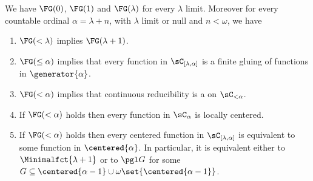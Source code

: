 \begin{proposition}\label{FGconsequences} We have $\FG(0)$, $\FG(1)$ and $\FG(\lambda)$ for every $\lambda$ limit. 
Moreover for every countable ordinal $\alpha=\lambda+n$, with $\lambda$ limit or null and $n<\omega$, we have
\begin{enumerate}
\item $\FG(<\lambda)$ implies $\FG(\lambda+1)$.
\item $\FG(\leq\alpha)$ implies that every function in $\sC_{[\lambda,\alpha]}$ is a finite gluing of functions in $\generator{\alpha}$.
\item $\FG(<\alpha)$ implies that continuous reducibility is a \bqo{} on $\sC_{< \alpha}$.
\item If $\FG(<\alpha)$ holds then every function in $\sC_\alpha$ is locally centered.
\item If $\FG(<\alpha)$ holds then every centered function in $\sC_{[\lambda,\alpha]}$ is equivalent to some function in $\centered{\alpha}$. In particular, it is equivalent either to $\Minimalfct{\lambda+1}$ or to $\pgl G$ for some $G\subseteq \centered{\alpha-1}\cup \omega\set{\centered{\alpha-1}}$.  
\end{enumerate}
\end{proposition}
